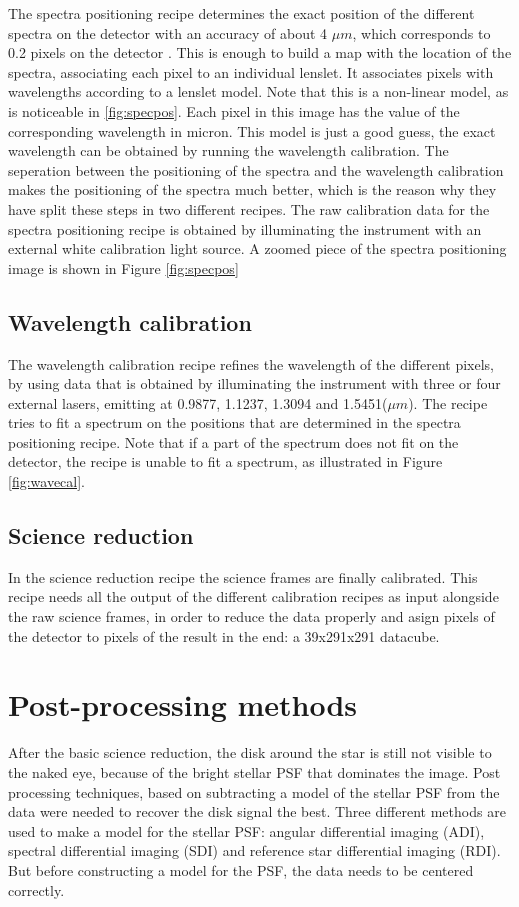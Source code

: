\documentclass[twoside,single,12pt]{lion-msc}
\begin{document}
The spectra positioning recipe determines the exact position of the different spectra on the detector with an accuracy of about 4 $\mu m$, which corresponds to 0.2 pixels on the detector \citep{Desidera2008}. This is enough to build a map with the location of the spectra, associating each pixel to an individual lenslet. It associates pixels with wavelengths according to a lenslet model. Note that this is a non-linear model, as is noticeable in \ref{fig:specpos}. Each pixel in this image has the value of the corresponding wavelength in micron. This model is just a good guess, the exact wavelength can be obtained by running the wavelength calibration. The seperation between the positioning of the spectra and the wavelength calibration makes the positioning of the spectra much better, which is the reason why they have split these steps in two different recipes. The raw calibration data for the spectra positioning recipe is obtained by illuminating the instrument with an external white calibration light source. A zoomed piece of the spectra positioning image is shown in Figure \ref{fig:specpos}

\subsection{Wavelength calibration}
The wavelength calibration recipe refines the wavelength of the different pixels, by using data that is obtained by illuminating the instrument with three or four external lasers, emitting at 0.9877, 1.1237, 1.3094 and 1.5451($\mu m$). The recipe tries to fit a spectrum on the positions that are determined in the spectra positioning recipe. Note that if a part of the spectrum does not fit on the detector, the recipe is unable to fit a spectrum, as illustrated in Figure \ref{fig:wavecal}.

\subsection{Science reduction}
In the science reduction recipe the science frames are finally calibrated. This recipe needs all the output of the different calibration recipes as input alongside the raw science frames, in order to reduce the data properly and asign pixels of the detector to pixels of the result in the end: a 39x291x291 datacube.

\section{Post-processing methods}
After the basic science reduction, the disk around the star is still not visible to the naked eye, because of the bright stellar PSF that dominates the image. Post processing techniques, based on subtracting a model of the stellar PSF from the data were needed to recover the disk signal the best. Three different methods are used to make a model for the stellar PSF: angular differential imaging (ADI), spectral differential imaging (SDI) and reference star differential imaging (RDI). But before constructing a model for the PSF, the data needs to be centered correctly.
\end{document}
